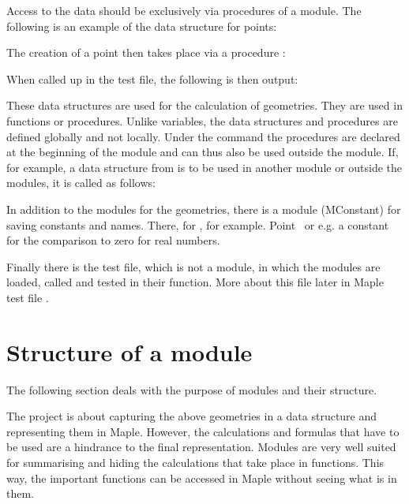 Access to the data should be exclusively via procedures of a module. The following is an example of the data structure for points:

\medskip

\MapleCommand{[MVPOINT,[x,y]]}

\medskip

The creation of a point then takes place via a procedure :

\medskip


\medskip

When called up in the test file, the following is then output:
 
\medskip


\medskip

These data structures are used for the calculation of geometries. They are used in functions or procedures. Unlike variables, the data structures and procedures are defined globally and not locally. Under the command  the procedures are declared at the beginning of the module and can thus also be used outside the module. If, for example, a data structure from  is to be used in another module or outside the modules, it is called as follows:

\medskip


\medskip

In addition to the modules for the geometries, there is a module (MConstant) for saving constants and names. There, for , for example.  \glqq Point \grqq \, or e.g. a constant for the comparison to zero for real numbers.


Finally there is the test file, which is not a module, in which the modules are loaded, called and tested in their function. More about this file later in  Maple test file \grqq.


\section{Structure of a module}

The following section deals with the purpose of modules and their structure. \medskip

The project is about capturing the above geometries in a data structure and representing them in Maple. However, the calculations and formulas that have to be used are a hindrance to the final representation. Modules are very well suited for summarising and hiding the calculations that take place in functions. This way, the important functions can be accessed in Maple without seeing what is in them. \medskip

